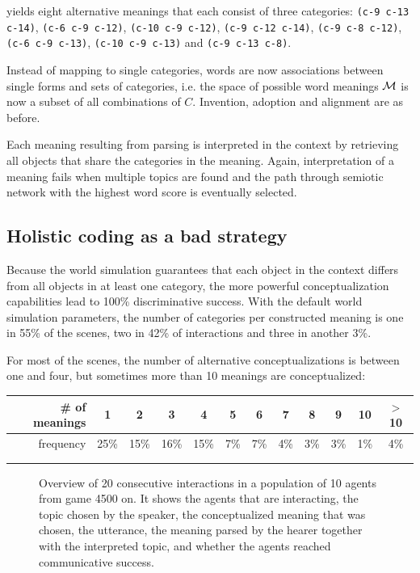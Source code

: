 \noindent yields eight alternative meanings that each consist of three
categories: \texttt{(c-9 c-13 c-14)}, \texttt{(c-6 c-9 c-12)},
\texttt{(c-10 c-9 c-12)}, \texttt{(c-9 c-12 c-14)}, \texttt{(c-9 c-8
  c-12)}, \texttt{(c-6 c-9 c-13)}, \texttt{(c-10 c-9 c-13)} and
\texttt{(c-9 c-13 c-8)}.


 Instead of mapping to single
categories, words are now associations between single forms and sets
of categories, i.e. the space of possible word meanings ${\cal M}$ is
now a subset of all combinations of $C$. Invention, adoption and
alignment are as before.

 Each meaning resulting from parsing is
interpreted in the context by retrieving all objects that share the
categories in the meaning. Again, interpretation of a meaning fails
when multiple topics are found and the path through semiotic network
with the highest word score is eventually selected.


\subsection{Holistic coding as a bad strategy}

Because the world simulation guarantees that each object in the
context differs from all objects in at least one category, the more
powerful conceptualization capabilities lead to 100\% discriminative
success. With the default world simulation parameters, the number of
categories per constructed meaning is one in 55\% of the scenes, two
in 42\% of interactions and three in another 3\%.

For most of the scenes, the number of alternative conceptualizations
is between one and four, but sometimes more than 10 meanings are
conceptualized:\\

{\small\sffamily
  \begin{tabular}{rccccccccccc}
    \# of meanings & 1 & 2 & 3 & 4 & 5 & 6 & 7 & 8 & 9 & 10 & $>$10 \\
    \hline
    frequency & 25\% & 15\% & 16\% & 15\% & 7\% & 7\% & 4\% & 3\% & 3\% & 1\% & 4\% \\
    \multicolumn{12}{c}{ } \\
    \multicolumn{12}{c}{ }
  \end{tabular}}

\begin{figure}[t]
  
  \caption{Overview of 20 consecutive interactions in a population of
    10 agents from game 4500 on. It shows the agents that are
    interacting, the topic chosen by the speaker, the conceptualized
    meaning that was chosen, the utterance, the meaning parsed by the
    hearer together with the interpreted topic, and whether the agents
    reached communicative success.}
  \label{f:sgg-sw-structured-trace}
\end{figure}

